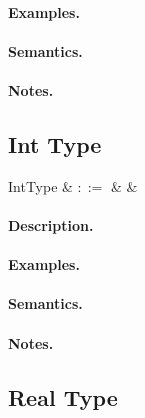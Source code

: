\paragraph{Examples.}

\paragraph{Semantics.}

\paragraph{Notes.} 


\subsection{Int Type}

\begin{syntax}
  IntType & $::=$ &  &\\
\end{syntax}

\paragraph{Description.}

\paragraph{Examples.}

\paragraph{Semantics.}

\paragraph{Notes.} 


\subsection{Real Type}

